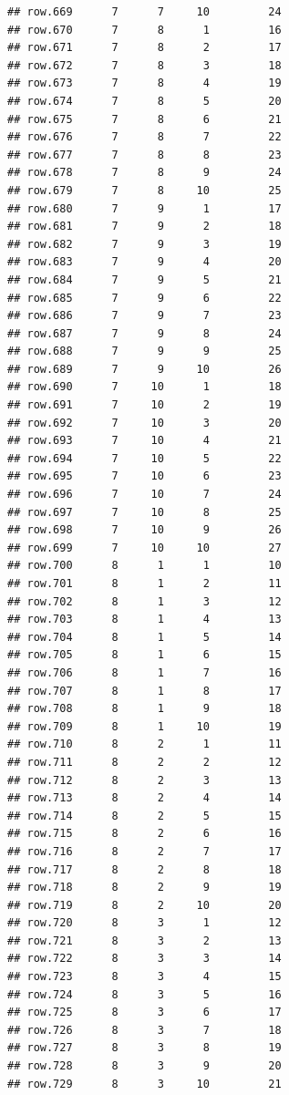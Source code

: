 \documentclass[
]{article}
\begin{document}
\begin{verbatim}
## row.669      7      7     10         24
## row.670      7      8      1         16
## row.671      7      8      2         17
## row.672      7      8      3         18
## row.673      7      8      4         19
## row.674      7      8      5         20
## row.675      7      8      6         21
## row.676      7      8      7         22
## row.677      7      8      8         23
## row.678      7      8      9         24
## row.679      7      8     10         25
## row.680      7      9      1         17
## row.681      7      9      2         18
## row.682      7      9      3         19
## row.683      7      9      4         20
## row.684      7      9      5         21
## row.685      7      9      6         22
## row.686      7      9      7         23
## row.687      7      9      8         24
## row.688      7      9      9         25
## row.689      7      9     10         26
## row.690      7     10      1         18
## row.691      7     10      2         19
## row.692      7     10      3         20
## row.693      7     10      4         21
## row.694      7     10      5         22
## row.695      7     10      6         23
## row.696      7     10      7         24
## row.697      7     10      8         25
## row.698      7     10      9         26
## row.699      7     10     10         27
## row.700      8      1      1         10
## row.701      8      1      2         11
## row.702      8      1      3         12
## row.703      8      1      4         13
## row.704      8      1      5         14
## row.705      8      1      6         15
## row.706      8      1      7         16
## row.707      8      1      8         17
## row.708      8      1      9         18
## row.709      8      1     10         19
## row.710      8      2      1         11
## row.711      8      2      2         12
## row.712      8      2      3         13
## row.713      8      2      4         14
## row.714      8      2      5         15
## row.715      8      2      6         16
## row.716      8      2      7         17
## row.717      8      2      8         18
## row.718      8      2      9         19
## row.719      8      2     10         20
## row.720      8      3      1         12
## row.721      8      3      2         13
## row.722      8      3      3         14
## row.723      8      3      4         15
## row.724      8      3      5         16
## row.725      8      3      6         17
## row.726      8      3      7         18
## row.727      8      3      8         19
## row.728      8      3      9         20
## row.729      8      3     10         21

\end{verbatim}
\end{document}
